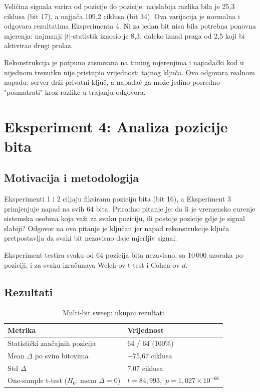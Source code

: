 Veličina signala varira od pozicije do pozicije: najslabija razlika bila je 25{,}3 ciklusa (bit 17), a najjača 109{,}2 ciklusa (bit 34). Ova varijacija je normalna i odgovara rezultatima Eksperimenta 4. Ni za jedan bit nisu bila potrebna ponovna mjerenja: najmanji $|t|$-statistik iznosio je 8{,}3, daleko iznad praga od 2{,}5 koji bi aktivirao drugi prolaz.

Rekonstrukcija je potpuno zasnovana na timing mjerenjima i napadački kod u nijednom trenutku nije pristupio vrijednosti tajnog ključa. Ovo odgovara realnom napadu: server drži privatni ključ, a napadač ga može jedino posredno "posmatrati" kroz razlike u trajanju odgovora.


\section{Eksperiment 4: Analiza pozicije bita}

\subsection{Motivacija i metodologija}

Eksperimenti 1 i 2 ciljaju fiksiranu poziciju bita (bit 16), a Eksperiment 3 primjenjuje napad na svih 64 bita. Prirodno pitanje je: da li je vremensko curenje sistemska osobina koja važi za svaku poziciju, ili postoje pozicije gdje je signal slabiji? Odgovor na ovo pitanje je ključan jer napad rekonstrukcije ključa pretpostavlja da svaki bit nezavisno daje mjerljiv signal.

Eksperiment testira svaku od 64 pozicija bita nezavisno, sa 10\,000 uzoraka po poziciji, i za svaku izračunava Welch-ov t-test i Cohen-ov $d$.

\subsection{Rezultati}

\begin{table}[H]
\centering
\caption{Multi-bit sweep: ukupni rezultati}
\label{tab:sweep_summary}
\begin{tabular}{ll}
\toprule
\textbf{Metrika} & \textbf{Vrijednost} \\
\midrule
Statistički značajnih pozicija & 64 / 64 (100\%) \\
Mean $\Delta$ po svim bitovima & +75{,}67 ciklusa \\
Std $\Delta$ & 7{,}07 ciklusa \\
One-sample t-test ($H_0$: mean $\Delta = 0$) & $t = 84{,}993$,\ $p = 1{,}027 \times 10^{-66}$ \\
\bottomrule
\end{tabular}
\end{table}

